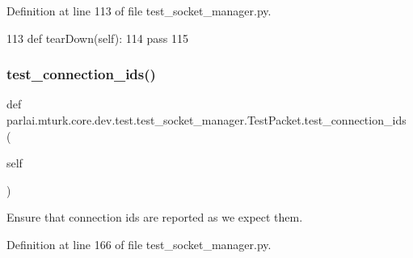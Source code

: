 Definition at line 113 of file test\+\_\+socket\+\_\+manager.\+py.


\begin{DoxyCode}
113     \textcolor{keyword}{def }tearDown(self):
114         \textcolor{keywordflow}{pass}
115 
\end{DoxyCode}
\mbox{\label{classparlai_1_1mturk_1_1core_1_1dev_1_1test_1_1test__socket__manager_1_1TestPacket_a58f0aa5e250cc0533e0ceccb80bbef06}} 
\subsubsection{\texorpdfstring{test\+\_\+connection\+\_\+ids()}{test\_connection\_ids()}}
{\footnotesize\ttfamily def parlai.\+mturk.\+core.\+dev.\+test.\+test\+\_\+socket\+\_\+manager.\+Test\+Packet.\+test\+\_\+connection\+\_\+ids (\begin{DoxyParamCaption}\item[{}]{self }\end{DoxyParamCaption})}

\begin{DoxyVerb}Ensure that connection ids are reported as we expect them.
\end{DoxyVerb}
 

Definition at line 166 of file test\+\_\+socket\+\_\+manager.\+py.


